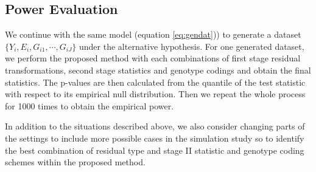 \documentclass{article}
\begin{document}
\subsection{Power Evaluation}
We continue with the same model (equation \ref{eq:gendat})) to generate a dataset $\{Y_i, E_i, G_{i1},\cdots, G_{iJ}\}$ under the alternative hypothesis. For one generated dataset, we perform the proposed method with each combinations of first stage residual transformations, second stage statistics and genotype codings and obtain the final statistics. The p-values are then calculated from the quantile of the test statistic with respect to its empirical null distribution. Then we repeat the whole process for 1000 times to obtain the empirical power. 



In addition to the situations described above, we also consider changing parts of the settings to include more possible cases in the simulation study so to identify the best combination of residual type and stage II statistic and genotype coding schemes within the proposed method. 
\end{document}
